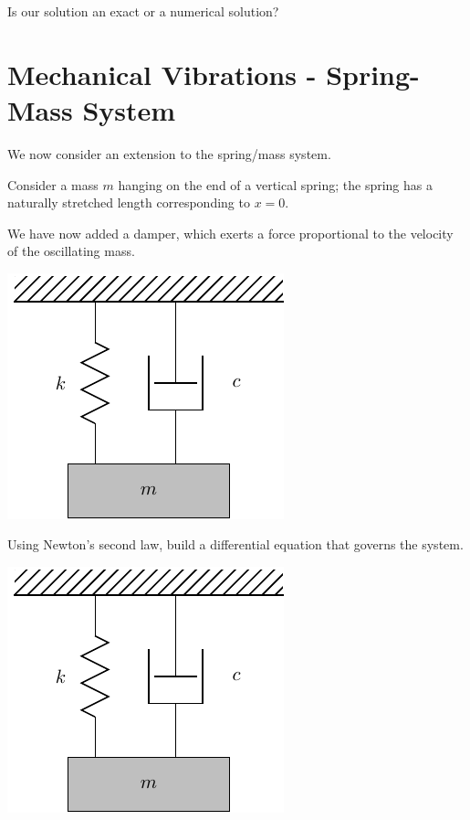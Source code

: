 \vfill

Is our solution an exact or a numerical solution?
\vspace{1.3in}


\newpage


\section*{Mechanical Vibrations - Spring-Mass System}

We now consider an extension to the spring/mass system.

Consider a mass $m$ hanging on the end of a vertical spring; the
spring has a naturally stretched length corresponding to $x=0$.

We have now added a damper, which exerts a force proportional to the
velocity of the oscillating mass.


\includegraphics[width=0.4\linewidth]{graphics/notes_08_hanging_mass}

\newpage

\problem Using Newton's second law, build a differential equation that
governs the system.

\includegraphics[width=0.35\linewidth]{graphics/notes_08_hanging_mass}




